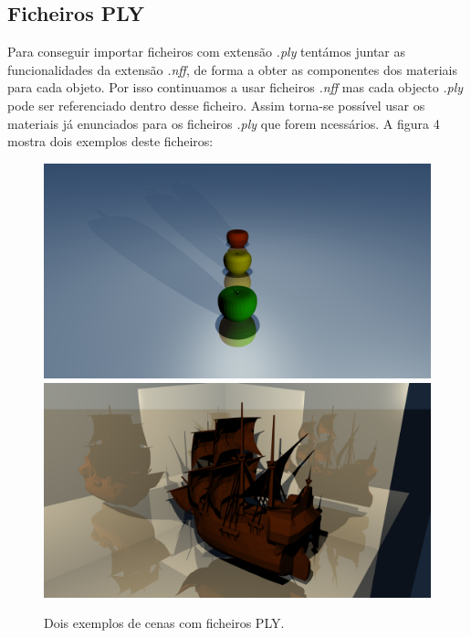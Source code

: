 \documentclass{article}
\begin{document}
        \subsection*{Ficheiros PLY}
            \par
            Para conseguir importar ficheiros com extensão \textit{.ply} tentámos juntar as funcionalidades da extensão \textit{.nff}, de forma a obter as componentes dos materiais para cada objeto. Por isso continuamos a usar ficheiros \textit{.nff} mas cada objecto \textit{.ply} pode ser referenciado dentro desse ficheiro. Assim torna-se possível usar os materiais já enunciados para os ficheiros \textit{.ply} que forem ncessários. A figura 4 mostra dois exemplos deste ficheiros:
            \begin{figure}[h!]
                \centering
                \includegraphics[scale=0.122]{apple}
                \includegraphics[scale=0.122]{boat}
                \caption{Dois exemplos de cenas com ficheiros PLY.}
            \end{figure} 
\end{document}
